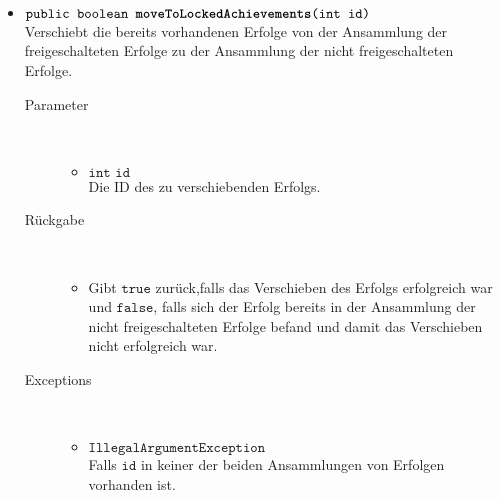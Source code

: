 \begin{description}
\begin{itemize}
\item $\texttt{public boolean \textbf{moveToLockedAchievements}(int id)}$ \\ Verschiebt die bereits vorhandenen Erfolge von der Ansammlung der freigeschalteten Erfolge zu der Ansammlung der nicht freigeschalteten Erfolge.
		\begin{description}
			\item[Parameter] \hfill \\
			\vspace{-.8cm}
			\begin{itemize}
				\item $\texttt{int id}$ \\ Die ID des zu verschiebenden Erfolgs.
			\end{itemize}
			\item[Rückgabe] \hfill \\
			\vspace{-.8cm}
			\begin{itemize}
				\item Gibt $\texttt{true}$ zurück,falls das Verschieben des Erfolgs erfolgreich war und $\texttt{false}$, falls sich der Erfolg bereits in der Ansammlung der nicht freigeschalteten Erfolge befand und damit das Verschieben nicht erfolgreich war.
			\end{itemize}
			\item[Exceptions] \hfill \\
			\vspace{-.8cm}
			\begin{itemize}
				\item $\texttt{IllegalArgumentException}$ \\ Falls $\texttt{id}$ in keiner der beiden Ansammlungen von Erfolgen vorhanden ist.
			\end{itemize}
		\end{description}	
	\end{itemize}
\end{description}